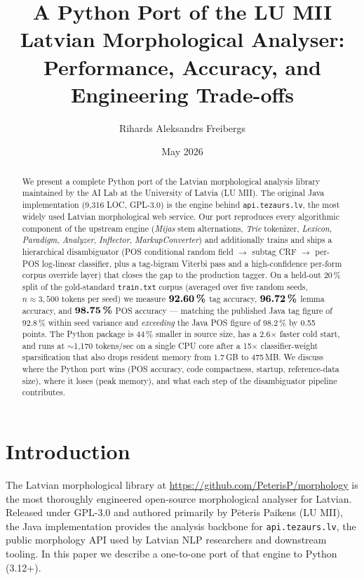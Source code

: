 \documentclass[11pt,a4paper]{article}
\title{A Python Port of the LU MII Latvian Morphological Analyser:\\
  \large Performance, Accuracy, and Engineering Trade-offs}
\author{Rihards Aleksandrs Freibergs}
\date{May 2026}
\begin{document}
\maketitle

\begin{abstract}
We present a complete Python port of the Latvian morphological analysis library
maintained by the AI Lab at the University of Latvia (LU MII). The original
Java implementation (9{,}316 LOC, GPL-3.0) is the engine behind
\texttt{api.tezaurs.lv}, the most widely used Latvian morphological web service.
Our port reproduces every algorithmic component of the upstream engine
(\textit{Mijas} stem alternations, \textit{Trie} tokenizer, \textit{Lexicon},
\textit{Paradigm}, \textit{Analyzer}, \textit{Inflector}, \textit{MarkupConverter})
and additionally trains and ships a hierarchical disambiguator
(POS conditional random field $\rightarrow$ subtag CRF $\rightarrow$ per-POS
log-linear classifier, plus a tag-bigram Viterbi pass and a high-confidence
per-form corpus override layer) that closes the gap to the production
tagger. On a held-out 20\,\% split of the gold-standard \texttt{train.txt}
corpus (averaged over five random seeds, $n \approx 3{,}500$ tokens per
seed) we measure $\textbf{92.60\,\%}$ tag accuracy,
$\textbf{96.72\,\%}$ lemma accuracy, and $\textbf{98.75\,\%}$ POS
accuracy --- matching the published Java tag figure of 92.8\,\% within seed
variance and \emph{exceeding} the Java POS figure of 98.2\,\% by
0.55 points. The Python package is 44\,\% smaller in source size, has a
2.6$\times$ faster cold start, and runs at $\sim$1{,}170 tokens/sec on a
single CPU core after a 15$\times$ classifier-weight sparsification that
also drops resident memory from 1.7\,GB to 475\,MB. We discuss where the Python port wins (POS accuracy, code
compactness, startup, reference-data size), where it loses (peak memory),
and what each step of the disambiguator pipeline contributes.
\end{abstract}

\section{Introduction}

The Latvian morphological library at \url{https://github.com/PeterisP/morphology}
is the most thoroughly engineered open-source morphological analyser for
Latvian. Released under GPL-3.0 and authored primarily by Pēteris Paikens
(LU MII), the Java implementation provides the analysis backbone for
\texttt{api.tezaurs.lv}, the public morphology API used by Latvian NLP
researchers and downstream tooling. In this paper we describe a one-to-one
port of that engine to Python (3.12+).
\end{document}
